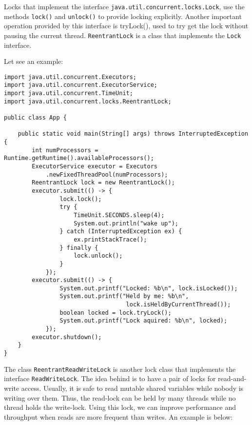 \documentclass{latex/classes/myarticle}
\begin{document}
Locks that implement the interface \texttt{java.util.concurrent.locks.Lock}, use the
methods \texttt{lock()} and \texttt{unlock()} to provide locking explicitly. Another important
operation provided by this interface is tryLock(), used to try get the lock
without pausing the current thread. \texttt{ReentrantLock} is a class that implements
the \texttt{Lock} interface.

Let see an example:

\begin{lstlisting}
import java.util.concurrent.Executors;
import java.util.concurrent.ExecutorService;
import java.util.concurrent.TimeUnit;
import java.util.concurrent.locks.ReentrantLock;

public class App {

    public static void main(String[] args) throws InterruptedException {
        int numProcessors = Runtime.getRuntime().availableProcessors();
        ExecutorService executor = Executors
            .newFixedThreadPool(numProcessors);
        ReentrantLock lock = new ReentrantLock();
        executor.submit(() -> {
                lock.lock();
                try {
                    TimeUnit.SECONDS.sleep(4);
                    System.out.println("wake up");
                } catch (InterruptedException ex) {
                    ex.printStackTrace();
                } finally {
                    lock.unlock();
                }
            });
        executor.submit(() -> {
                System.out.printf("Locked: %b\n", lock.isLocked());
                System.out.printf("Held by me: %b\n",
                                   lock.isHeldByCurrentThread());
                boolean locked = lock.tryLock();
                System.out.printf("Lock aquired: %b\n", locked);
            });
        executor.shutdown();
    }
}
\end{lstlisting}

The class \texttt{ReentrantReadWriteLock} is another lock class that implements the
interface \texttt{ReadWriteLock}.  The idea behind is to have a pair of locks for
read-and-write access. Usually, it is safe to read mutable shared variables
while nobody is writing over them. Thus, the read-lock can be held by many
threads while no thread holds the write-lock. Using this lock, we can
improve performance and throughput when reads are more frequent than
writes. An example is below:
\end{document}
